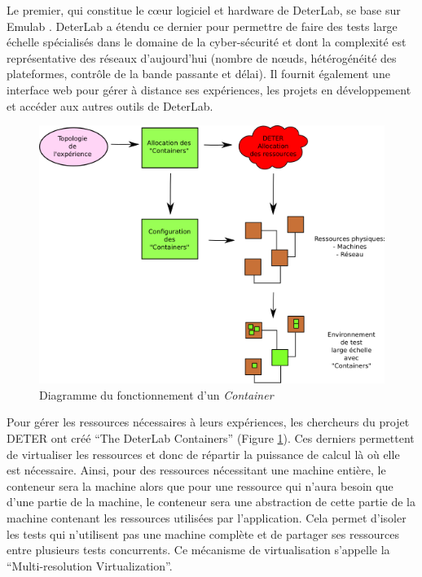 Le premier, qui constitue le c\oe ur logiciel et hardware de DeterLab, se base
sur Emulab \citep{EMULAB_INIT}. DeterLab a étendu ce dernier pour permettre de
faire des tests large échelle spécialisés dans le domaine de la cyber-sécurité
et dont la complexité est représentative des réseaux d'aujourd'hui (nombre de
n\oe uds, hétérogénéité des plateformes, contrôle de la bande passante et
délai). Il fournit également une interface web pour gérer à distance ses
expériences, les projets en développement et accéder aux autres outils de
DeterLab.

\begin{figure}
  \centering \includegraphics[scale=0.75]{Pictures/png/Deter_fonctionnement_container_v2}
  \caption{Diagramme du fonctionnement d'un \textit{Container}}
  \label{Conteneur}
\end{figure}

Pour gérer les ressources nécessaires à leurs expériences, les
chercheurs du projet DETER ont créé ``The DeterLab Containers''
(Figure \ref{Conteneur}). Ces derniers permettent de virtualiser les
ressources et donc de répartir la puissance de calcul là où elle est
nécessaire. Ainsi, pour des ressources nécessitant une machine entière,
le conteneur sera la machine alors que pour une ressource qui n'aura
besoin que d'une partie de la machine, le conteneur sera une
abstraction de cette partie de la machine contenant les ressources
utilisées par l'application. Cela permet d'isoler les tests qui
n'utilisent pas une machine complète et de partager ses ressources
entre plusieurs tests concurrents. Ce mécanisme de virtualisation
s'appelle la ``Multi-resolution Virtualization''.

